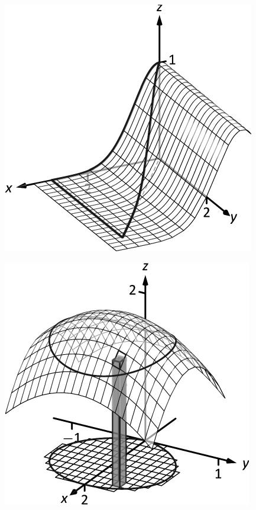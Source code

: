 \documentclass[10pt]{article}
\begin{document}
\includegraphics{figdouble6b_3DBW.pdf}
\texttt{}

\includegraphics{figdouble_intro2_3DBW.pdf}
\texttt{}
\end{document}
